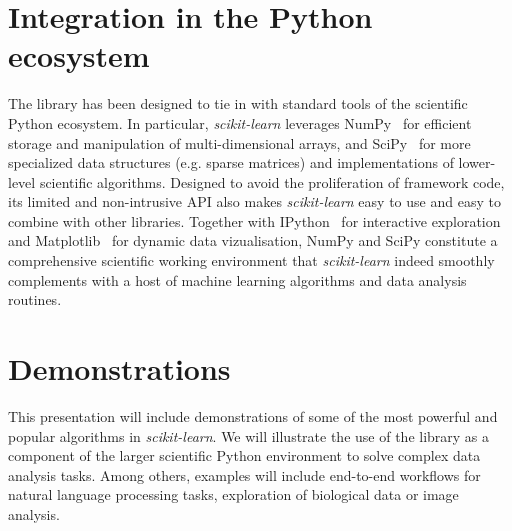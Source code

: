\documentclass{article}
\newcommand{\sklearn}{\textit{scikit-learn}\xspace}
\DeclareRobustCommand{\VAN}[3]{#2}
\begin{document}
\section*{Integration in the Python ecosystem}

The library has been designed to tie in with standard tools of the scientific
Python ecosystem. In particular, \sklearn leverages NumPy~\citep{vanderwalt2011} for
efficient storage and manipulation of multi-dimensional arrays, and
SciPy~\citep{oliphant2007python} for more specialized data structures  (e.g.
sparse matrices) and implementations of lower-level scientific algorithms.
Designed to avoid the proliferation of framework code, its limited and
non-intrusive API also makes \sklearn easy to use and easy to combine with other
libraries. Together with IPython~\citep{perez2007ipython} for interactive
exploration and Matplotlib~\citep{hunter2007matplotlib} for dynamic data
vizualisation, NumPy and SciPy constitute a comprehensive scientific working
environment that \sklearn indeed smoothly complements with a host of machine
learning algorithms and data analysis routines.


\section*{Demonstrations}

This presentation will include demonstrations of some of the most powerful and
popular algorithms in \sklearn. We will illustrate the use of the
library as a component of the larger scientific Python environment to solve
complex data analysis tasks. Among others, examples will include end-to-end
workflows for natural language processing tasks, exploration of biological data
or image analysis.


{\small

\DeclareRobustCommand{\VAN}[3]{#3}
\setlength{\bibsep}{1mm}

}
\end{document}
